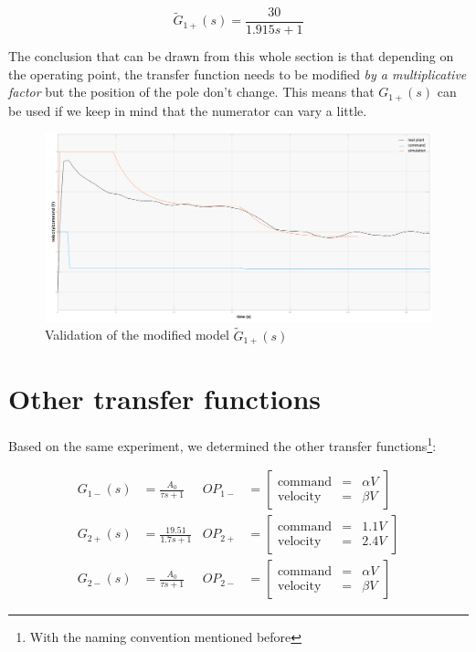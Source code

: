 \begin{equation}
    \tilde{G}_{1+}(s) = \frac{30}{1.915 s + 1}
\end{equation}

The conclusion that can be drawn from this whole section is that depending on the operating point, the transfer function
needs to be modified \textit{by a multiplicative factor} but the position of the pole don't change. This means that 
$G_{1+}(s)$ can be used if we keep in mind that the numerator can vary a little.

\begin{figure}[H]
    \centering
    \includegraphics[height=\textheight/3]{Pictures/validation_A0_30.png}
    \caption{Validation of the modified model $\tilde{G}_{1+}(s)$}
    \label{validation_A0_30}
\end{figure}

\section{Other transfer functions}

Based on the same experiment, we determined the other transfer functions\footnote{With the naming convention mentioned 
before}:

\begin{align}
    G_{1-}(s) &= \frac{A_0}{\tau s + 1} & OP_{1-} &= \begin{bmatrix}
                \text{command} & = & \alpha V \\
                \text{velocity} & = & \beta V
                \end{bmatrix} 
    \label{TF_mot1_-} \\
    G_{2+}(s) &= \frac{19.51}{1.7 s + 1} & OP_{2+} &= \begin{bmatrix}
                \text{command} & = & 1.1 V \\
                \text{velocity} & = & 2.4 V
                \end{bmatrix} 
    \label{TF_mot2_+} \\
    G_{2-}(s) &= \frac{A_0}{\tau s + 1} & OP_{2-} &= \begin{bmatrix}
                \text{command} & = & \alpha V \\
                \text{velocity} & = & \beta V
                \end{bmatrix} 
    \label{TF_mot2_-}
\end{align}


